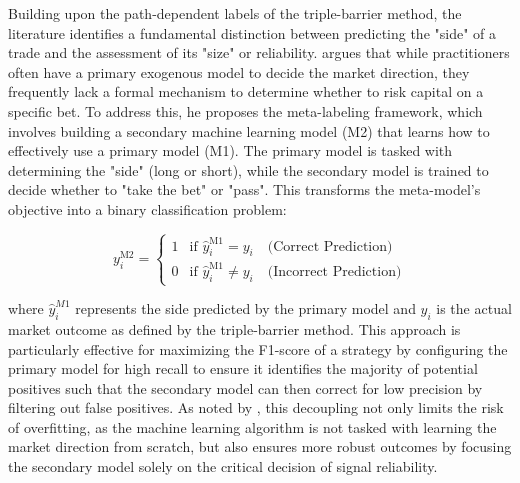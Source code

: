 \documentclass[12pt, a4paper]{article}
\begin{document}
\medskip

Building upon the path-dependent labels of the triple-barrier method, the literature identifies a fundamental distinction between predicting the 
"side" of a trade and the assessment of its "size" or reliability. \textcite{lopez_de_prado_advances_2018} argues that while practitioners often have a 
primary exogenous model to decide the market direction, they frequently lack a formal mechanism to determine whether to risk capital on a specific bet. 
To address this, he proposes the meta-labeling framework, which involves building a secondary machine learning model (M2) that learns how to 
effectively use a primary model (M1). The primary model is tasked with determining the "side" (long or short), 
while the secondary model is trained to decide whether to "take the bet" or "pass". 
This transforms the meta-model's objective into a binary classification problem:

\begin{equation}
y_i^{\text{M2}} = \begin{cases}
1 & \text{if } \hat{y}_i^{\text{M1}} = y_i \quad \text{(Correct Prediction)} \\
0 & \text{if } \hat{y}_i^{\text{M1}} \neq y_i \quad \text{(Incorrect Prediction)}
\label{eq:meta_label}
\end{cases}
\end{equation}

where \( \hat{y}_i^{M1} \) represents the side predicted by the primary model and \( y_i \) is the actual market outcome as defined by the triple-barrier method. 
This approach is particularly effective for maximizing the F1-score of a strategy by configuring the primary model for high recall to ensure it 
identifies the majority of potential positives such that the secondary model can then correct for low precision by filtering out false positives. 
As noted by \textcite{lopez_de_prado_advances_2018}, this decoupling not only limits the risk of overfitting, as the machine
learning algorithm is not tasked with learning the market direction from scratch, 
but also ensures more robust outcomes by focusing the secondary model solely on the critical decision of signal reliability.

\medskip
\end{document}
